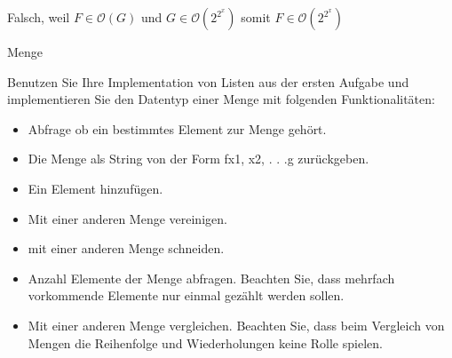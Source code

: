 \begin{questions}
	\begin{solutionordottedlines}[2cm]
	Falsch, weil $F \in \mathcal{O}(G)$ und $G \in \mathcal{O}(2^{2^x})$ somit $F \in \mathcal{O}(2^{2^x})$
	\end{solutionordottedlines}
		

	\question Menge
	
	Benutzen Sie Ihre Implementation von Listen aus der ersten Aufgabe und implementieren Sie den Datentyp einer Menge mit folgenden Funktionalitäten:
	
	\begin{itemize}
	 \item Abfrage ob ein bestimmtes Element zur Menge gehört.

	 \item Die Menge als String von der Form fx1, x2, . . .g zurückgeben.

	  \item Ein Element hinzufügen.

	  \item Mit einer anderen Menge vereinigen.

	  \item mit einer anderen Menge schneiden.

	  \item Anzahl Elemente der Menge abfragen. Beachten Sie, dass mehrfach vorkommende Elemente nur einmal gezählt werden sollen.

	  \item Mit einer anderen Menge vergleichen. Beachten Sie, dass beim Vergleich von
Mengen die Reihenfolge und Wiederholungen keine Rolle spielen.
	\end{itemize}

	
	\begin{solutionordottedlines}[2cm]
	\end{solutionordottedlines}
		
		
	
\end{questions}

